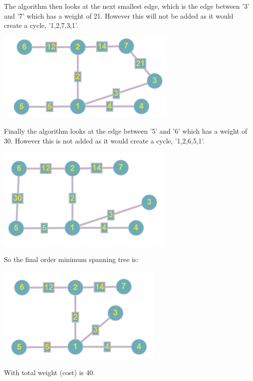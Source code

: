 \documentclass{article}
\begin{document}
The algorithm then looks at the next smallest edge, which is the edge between '3' and '7' which has a weight of 21. However this will not be added as it would create a cycle, '1,2,7,3,1'. 
\newline
\begin{center}
\includegraphics{b23c1}
\end{center}
Finally the algorithm looks at the edge between '5' and '6' which has a weight of 30. However this is not added as it would create a cycle, '1,2,6,5,1'.
\newline
\begin{center}
\includegraphics{b23c2}
\end{center}
So the final order minimum spanning tree is:
\begin{center}
\includegraphics{b236}
\end{center}
With total weight (cost) is 40.
\end{document}
